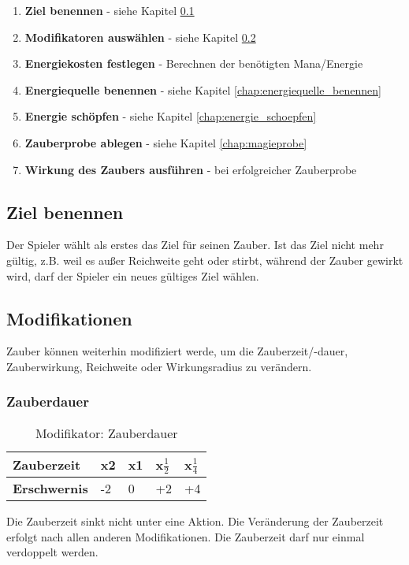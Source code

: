 \begin{enumerate}
\item \textbf{Ziel benennen} - siehe Kapitel \ref{chap:ziel_benennen}
\item \textbf{Modifikatoren auswählen} - siehe Kapitel \ref{chap:zauber_modifikationen}
\item \textbf{Energiekosten festlegen} - Berechnen der benötigten Mana/Energie
\item \textbf{Energiequelle benennen} - siehe Kapitel \ref{chap:energiequelle_benennen}
\item \textbf{Energie schöpfen} - siehe Kapitel \ref{chap:energie_schoepfen}
\item \textbf{Zauberprobe ablegen} - siehe Kapitel \ref{chap:magieprobe}
\item \textbf{Wirkung des Zaubers ausführen} - bei erfolgreicher Zauberprobe
\end{enumerate}

\subsection{Ziel benennen}
\label{chap:ziel_benennen}
Der Spieler wählt als erstes das Ziel für seinen Zauber. Ist das Ziel nicht mehr gültig, z.B. weil es außer Reichweite geht oder stirbt, während der Zauber gewirkt wird, darf der Spieler ein neues gültiges Ziel wählen.

\subsection{Modifikationen}
\label{chap:zauber_modifikationen}
Zauber können weiterhin modifiziert werde, um die Zauberzeit/-dauer, Zauberwirkung, Reichweite oder Wirkungsradius zu verändern.

\subsubsection{Zauberdauer}
\begin{table}[H]
\begin{center}
\begin{tabular}{|l|l|l|l|l|}
\hline
\textbf{Zauberzeit} & x2 & x1 & x$\frac{1}{2}$ & x$\frac{1}{4}$ \\ \hline
\textbf{Erschwernis} & -2 & 0 & +2 & +4 \\ \hline

\end{tabular}
\end{center}
\caption{Modifikator: Zauberdauer}
\label{tab:modifikator_zauberdauer}
\end{table}
Die Zauberzeit sinkt nicht unter eine Aktion. Die Veränderung der Zauberzeit erfolgt nach allen anderen Modifikationen. Die Zauberzeit darf nur einmal verdoppelt werden.


